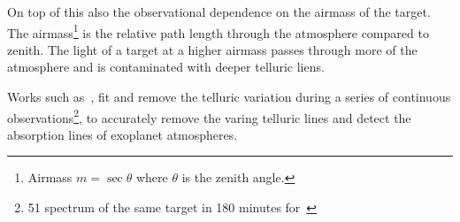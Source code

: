 On top of this also the observational dependence on the airmass of the target.
The airmass\footnote{Airmass $m=\sec{\theta}$ where $\theta$ is the zenith angle.} is the relative path length through the atmosphere compared to zenith.
The light of a target at a higher airmass passes through more of the atmosphere and is contaminated with deeper telluric liens.

Works such as~\citet{snellen_orbital_2010}, fit and remove the telluric variation during a series of continuous observations\footnote{51 spectrum of the same target in 180 minutes for~\citet{snellen_orbital_2010}}, to accurately remove the varing telluric lines and detect the absorption lines of exoplanet atmospheres.


